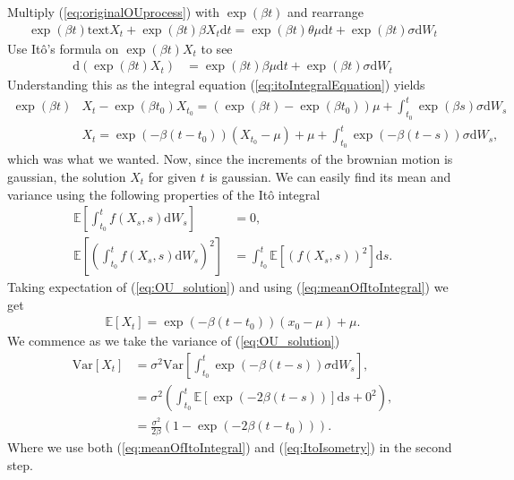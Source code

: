 Multiply (\ref{eq:originalOUprocess}) with $\exp\left(\beta t\right)$ and rearrange
\begin{align}
    \exp\left(\beta t\right)\mathrm{text}X_t + \exp\left(\beta t\right) \beta X_t \mathrm{d}t = \exp\left(\beta t\right)\theta\mu \mathrm{d}t + \exp\left(\beta t\right)\sigma \mathrm{d}W_t
\end{align}
Use Itô's formula on $\exp\left(\beta t\right)X_t$ to see
\begin{align}
    \mathrm{d}\left(\exp\left(\beta t\right)X_t\right) &= \exp\left(\beta t\right)\beta \mu \mathrm{d}t + \exp\left(\beta t\right) \sigma \mathrm{d}W_t \nonumber
\end{align}
Understanding this as the integral equation (\ref{eq:itoIntegralEquation}) yields
\begin{align}
    \exp\left(\beta t\right)&X_t - \exp\left(\beta t_0\right)X_{t_0} = \left(\exp\left(\beta t\right) - \exp\left(\beta t_0\right)\right)\mu + \int_{t_0}^t \exp\left(\beta s\right)\sigma \mathrm{d}W_s \nonumber \\
    &X_t = \exp\left(-\beta\left(t - t_0\right)\right)\left(X_{t_0} - \mu\right) + \mu + \int_{t_0}^t \exp\left(-\beta \left(t - s\right)\right)\sigma \mathrm{d}W_s \label{eq:OU_solution},
\end{align}
which was what we wanted. Now, since the increments of the brownian motion is gaussian, the solution $X_t$ for given $t$ is gaussian. We can easily find its mean and variance using the following properties of the Itô integral \cite[theorem 3.2.1 and lemma 3.1.5]{Oksendal2003_yu}
\begin{align}
    \mathbb{E}\left[\int_{t_0}^t f(X_s, s) \mathrm{d}W_s\right] &= 0 \label{eq:meanOfItoIntegral},\\
    \mathbb{E}\left[\left(\int_{t_0}^t f(X_s, s) \mathrm{d}W_s\right)^2\right] &= \int_{t_0}^t \mathbb{E}\left[\left(f(X_s, s)\right)^2\right] \mathrm{d}s. \label{eq:ItoIsometry}
\end{align}
Taking expectation of (\ref{eq:OU_solution}) and using (\ref{eq:meanOfItoIntegral}) we get
\begin{align}
    \mathbb{E}\left[X_t\right] = \exp\left(-\beta\left(t - t_0\right)\right)\left(x_0 - \mu\right) + \mu.
\end{align}
We commence as we take the variance of (\ref{eq:OU_solution})
\begin{align}
    \mathrm{Var}\left[X_t\right] &= \sigma^2\mathrm{Var}\left[\int_{t_0}^t \exp\left(-\beta \left(t - s\right)\right)\sigma \mathrm{d}W_s\right],\nonumber \\
    & = \sigma^2\left(\int_{t_0}^t \mathbb{E}\left[\exp\left(-2\beta\left(t - s\right)\right)\right] \mathrm{d}s + 0^2 \right), \nonumber \\
    & = \frac{\sigma^2}{2\beta}\left(1 - \exp\left(-2\beta(t - t_0)\right)\right).
\end{align}
Where we use both (\ref{eq:meanOfItoIntegral}) and (\ref{eq:ItoIsometry}) in the second step.

